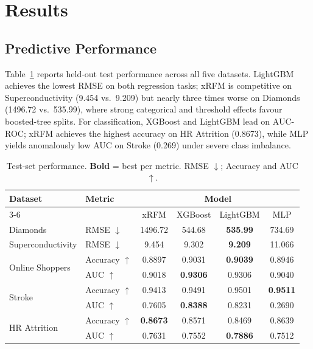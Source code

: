 
\section{Results}

\subsection{Predictive Performance}

Table~\ref{tab:main-results} reports held-out test performance across all five datasets.
LightGBM achieves the lowest RMSE on both regression tasks; xRFM is competitive on Superconductivity
(9.454 vs.\ 9.209) but nearly three times worse on Diamonds (1496.72 vs.\ 535.99), where strong
categorical and threshold effects favour boosted-tree splits.
For classification, XGBoost and LightGBM lead on AUC-ROC; xRFM achieves the highest accuracy on
HR Attrition (0.8673), while MLP yields anomalously low AUC on Stroke (0.269) under severe class imbalance.

\begin{table}[htbp]
  \centering
  \caption{Test-set performance. \textbf{Bold} = best per metric. RMSE $\downarrow$; Accuracy and AUC $\uparrow$.}
  \label{tab:main-results}
  \small
  \begin{tabular}{llcccc}
    \toprule
    \multirow{2}{*}{Dataset} & \multirow{2}{*}{Metric}
      & \multicolumn{4}{c}{Model} \\
    \cmidrule(lr){3-6}
      & & xRFM & XGBoost & LightGBM & MLP \\
    \midrule
    Diamonds             & RMSE $\downarrow$      & 1496.72 & 544.68 & \textbf{535.99} & 734.69 \\[2pt]
    Superconductivity    & RMSE $\downarrow$      & 9.454 & 9.302 & \textbf{9.209} & 11.066 \\[4pt]
    \multirow{2}{*}{Online Shoppers}
      & Accuracy $\uparrow$ & 0.8897 & 0.9031 & \textbf{0.9039} & 0.8946 \\
      & AUC $\uparrow$      & 0.9018 & \textbf{0.9306} & 0.9306 & 0.9040 \\[2pt]
    \multirow{2}{*}{Stroke}
      & Accuracy $\uparrow$ & 0.9413 & 0.9491 & 0.9501 & \textbf{0.9511} \\
      & AUC $\uparrow$      & 0.7605 & \textbf{0.8388} & 0.8231 & 0.2690 \\[2pt]
    \multirow{2}{*}{HR Attrition}
      & Accuracy $\uparrow$ & \textbf{0.8673} & 0.8571 & 0.8469 & 0.8639 \\
      & AUC $\uparrow$      & 0.7631 & 0.7552 & \textbf{0.7886} & 0.7512 \\
    \bottomrule
  \end{tabular}
\end{table}

